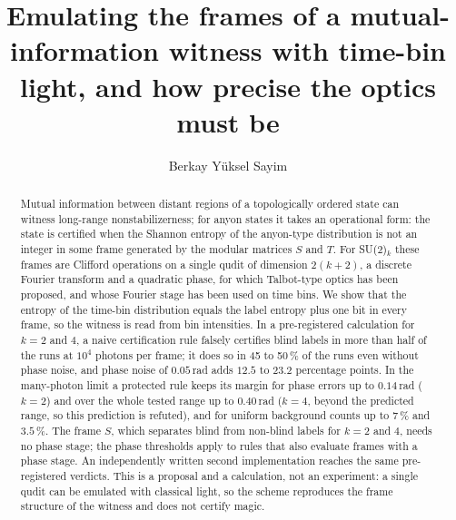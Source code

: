 \documentclass[aps,pra,reprint,superscriptaddress,nofootinbib]{revtex4-2}
\begin{document}
\title{Emulating the frames of a mutual-information witness with time-bin light, and how precise the optics must be}
\author{Berkay Y{\"u}ksel Sayim}

\begin{abstract}
Mutual information between distant regions of a topologically ordered state can witness long-range nonstabilizerness; for anyon states it takes an operational form: the state is certified when the Shannon entropy of the anyon-type distribution is not an integer in some frame generated by the modular matrices $S$ and $T$.
For SU(2)$_k$ these frames are Clifford operations on a single qudit of dimension $2(k+2)$, a discrete Fourier transform and a quadratic phase, for which Talbot-type optics has been proposed, and whose Fourier stage has been used on time bins.
We show that the entropy of the time-bin distribution equals the label entropy plus one bit in every frame, so the witness is read from bin intensities.
In a pre-registered calculation for $k=2$ and $4$, a naive certification rule falsely certifies blind labels in more than half of the runs at $10^4$ photons per frame; it does so in 45 to 50\,\% of the runs even without phase noise, and phase noise of $0.05$\,rad adds $12.5$ to $23.2$ percentage points.
In the many-photon limit a protected rule keeps its margin for phase errors up to $0.14$\,rad ($k=2$) and over the whole tested range up to $0.40$\,rad ($k=4$, beyond the predicted range, so this prediction is refuted), and for uniform background counts up to $7\,\%$ and $3.5\,\%$.
The frame $S$, which separates blind from non-blind labels for $k=2$ and $4$, needs no phase stage; the phase thresholds apply to rules that also evaluate frames with a phase stage.
An independently written second implementation reaches the same pre-registered verdicts.
This is a proposal and a calculation, not an experiment: a single qudit can be emulated with classical light, so the scheme reproduces the frame structure of the witness and does not certify magic.
\end{abstract}
\maketitle
\end{document}
